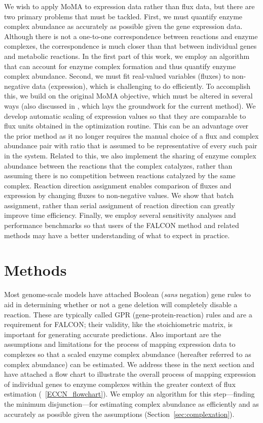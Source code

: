 We wish to apply MoMA to expression data rather than flux data, but there
are two primary problems that must be tackled. First, we must quantify
enzyme complex abundance as accurately as possible given the gene expression
data. Although there is not a one-to-one correspondence between
reactions and enzyme complexes, the correspondence is much closer
than that between individual genes and metabolic reactions. In the
first part of this work, we employ an algorithm that can account for
enzyme complex formation and thus quantify enzyme complex
abundance. Second, we must fit real-valued variables (fluxes) to 
non-negative data (expression), which is challenging to do
efficiently. To accomplish this, we build on the original MoMA
objective, which must be altered in several ways (also discussed in
\citealt{Lee2012}, which lays the groundwork for the current
method). We develop automatic scaling of expression values so that
they are comparable to flux units obtained in the optimization
routine. This can be an advantage over the prior method as it no longer requires
the manual choice of a flux and complex abundance pair with ratio that
is assumed to be representative of every such pair in the system.
Related to this, we also implement the sharing of enzyme complex
abundance between the reactions that the complex catalyzes, rather
than assuming there is no competition between reactions catalyzed by
the same complex. Reaction direction assignment enables comparison of
fluxes and expression by changing fluxes to non-negative values. We
show that batch assignment, rather than serial assignment
\citep{Lee2012} of reaction direction can greatly improve time
efficiency.  Finally, we employ several sensitivity analyses and
performance benchmarks so that users of the FALCON method and related
methods may have a better understanding of what to expect in practice.

\section{Methods}

Most genome-scale models have attached Boolean (\textit{sans}
negation) gene rules to aid in determining whether or not a gene
deletion will
completely disable a reaction. These are typically called GPR
(gene-protein-reaction) rules and are a requirement for FALCON; their
validity, like the stoichiometric matrix, is
important for generating accurate predictions. Also important are the
assumptions and limitations for the process of mapping expression data
to complexes so that a scaled enzyme complex abundance (hereafter
referred to as complex abundance) can be estimated. We address these
in the next section and have attached a flow chart to illustrate the
overall process of mapping expression of individual genes to enzyme
complexes within the greater context of flux estimation 
(\Fig~\ref{ECCN_flowchart}). We employ an algorithm for
this step---finding the minimum disjunction---for estimating complex
abundance as efficiently and as accurately as possible given the
assumptions (\suppOrApp Section~\ref{sec:complexation}).

